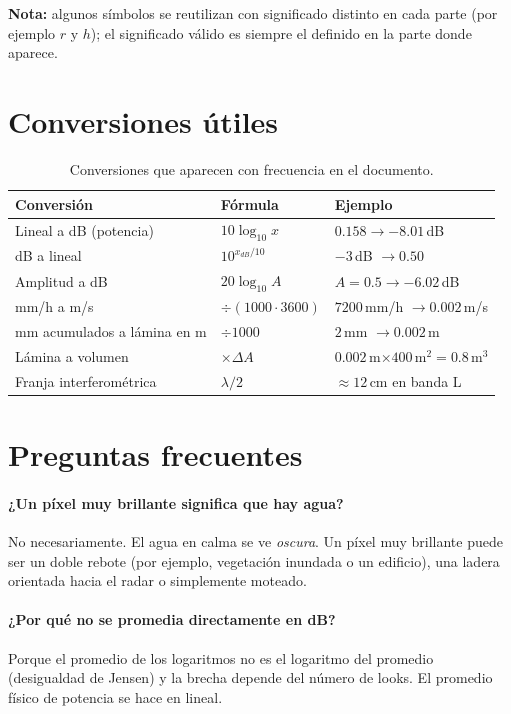 \documentclass[11pt,a4paper]{article}
\begin{document}
\noindent\textbf{Nota:} algunos símbolos se reutilizan con significado distinto en cada parte (por ejemplo $r$ y
$h$); el significado válido es siempre el definido en la parte donde aparece.

\section{Conversiones útiles}
\label{sec:conversiones}

\begin{table}[htbp]
\centering\small
\begin{tabular}{lll}
\toprule
Conversión & Fórmula & Ejemplo\\\midrule
Lineal a dB (potencia) & $10\log_{10}x$ & $0.158\to-8.01$\,dB\\
dB a lineal & $10^{x_{dB}/10}$ & $-3$\,dB $\to0.50$\\
Amplitud a dB & $20\log_{10}A$ & $A=0.5\to-6.02$\,dB\\
mm/h a m/s & $\div(1000\cdot3600)$ & $7200$\,mm/h $\to0.002$\,m/s\\
mm acumulados a lámina en m & $\div1000$ & $2$\,mm $\to0.002$\,m\\
Lámina a volumen & $\times\Delta A$ & $0.002$\,m$\times400$\,m$^2=0.8$\,m$^3$\\
Franja interferométrica & $\lambda/2$ & $\approx12$\,cm en banda L\\\bottomrule
\end{tabular}
\caption{Conversiones que aparecen con frecuencia en el documento.}
\label{tab:conversiones}
\end{table}

\section{Preguntas frecuentes}
\label{sec:faq}

\paragraph{¿Un píxel muy brillante significa que hay agua?}
No necesariamente. El agua en calma se ve \emph{oscura}. Un píxel muy brillante puede ser un doble rebote (por
ejemplo, vegetación inundada o un edificio), una ladera orientada hacia el radar o simplemente moteado.

\paragraph{¿Por qué no se promedia directamente en dB?}
Porque el promedio de los logaritmos no es el logaritmo del promedio (desigualdad de Jensen) y la brecha
depende del número de looks. El promedio físico de potencia se hace en lineal.
\end{document}
